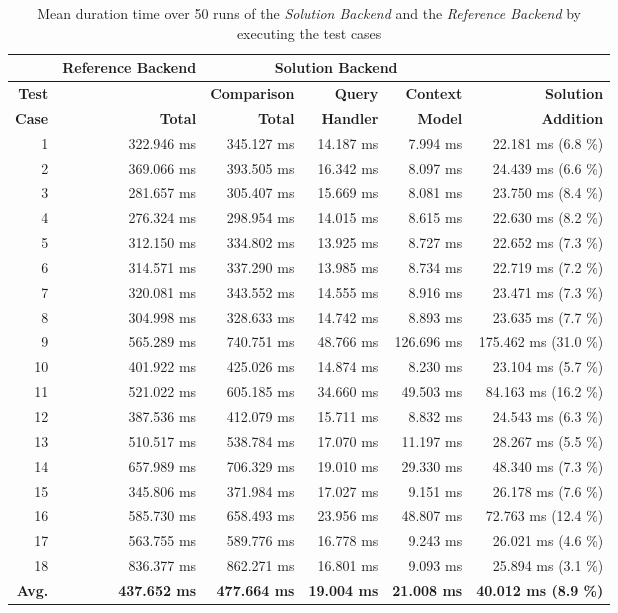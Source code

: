 \documentclass[draft,final]{vutinfth} %
\begin{document}
\begin{table}[]
	\caption{Mean duration time over 50 runs of the \textit{Solution Backend} and the \textit{Reference Backend} by executing the test cases}
	\begin{tabular}{r|r|r|r|r|r}
		
		\textbf{} & \textbf{Reference Backend} & \multicolumn{3}{c|}{\textbf{Solution Backend}} &  \\ \hline \textbf{Test} & \textbf{} & \textbf{Comparison} & \textbf{Query} & \textbf{Context} & \textbf{Solution} \\ 
		\textbf{Case} & \textbf{Total} & \textbf{Total} & \textbf{Handler} & \textbf{Model} & \textbf{Addition} \\ \hline
		1 & 322.946 ms & 345.127 ms & 14.187 ms & 7.994 ms & 22.181 ms (6.8 \%) \\ 
		2 & 369.066 ms & 393.505 ms & 16.342 ms & 8.097 ms & 24.439 ms (6.6 \%)\\ 
		3 & 281.657 ms & 305.407 ms & 15.669 ms & 8.081 ms & 23.750 ms (8.4 \%)\\ 
		4 & 276.324 ms & 298.954 ms & 14.015 ms & 8.615 ms & 22.630 ms (8.2 \%)\\ 
		5 & 312.150 ms & 334.802 ms & 13.925 ms & 8.727 ms & 22.652 ms (7.3 \%)\\ 
		6 & 314.571 ms & 337.290 ms & 13.985 ms & 8.734 ms & 22.719 ms (7.2 \%)\\ 
		7 & 320.081 ms & 343.552 ms & 14.555 ms & 8.916 ms & 23.471 ms (7.3 \%)\\ 
		8 & 304.998 ms & 328.633 ms & 14.742 ms & 8.893 ms & 23.635 ms (7.7 \%)\\ 
		9 & 565.289 ms & 740.751 ms & 48.766 ms & 126.696 ms & 175.462 ms (31.0 \%)\\ 
		10 & 401.922 ms & 425.026 ms & 14.874 ms & 8.230 ms & 23.104 ms (5.7 \%)\\ 
		11 & 521.022 ms & 605.185 ms & 34.660 ms & 49.503 ms & 84.163 ms (16.2 \%)\\ 
		12 & 387.536 ms & 412.079 ms & 15.711 ms & 8.832 ms & 24.543 ms (6.3 \%)\\ 
		13 & 510.517 ms & 538.784 ms & 17.070 ms & 11.197 ms & 28.267 ms (5.5 \%)\\ 
		14 & 657.989 ms & 706.329 ms & 19.010 ms & 29.330 ms & 48.340 ms (7.3 \%)\\ 
		15 & 345.806 ms & 371.984 ms & 17.027 ms & 9.151 ms & 26.178 ms (7.6 \%)\\ 
		16 & 585.730 ms & 658.493 ms & 23.956 ms & 48.807 ms & 72.763 ms (12.4 \%)\\ 
		17 & 563.755 ms & 589.776 ms & 16.778 ms & 9.243 ms & 26.021 ms (4.6 \%)\\ 
		18 & 836.377 ms & 862.271 ms & 16.801 ms & 9.093 ms & 25.894 ms (3.1 \%)\\ \hline
		\textbf{Avg.} & \textbf{437.652 ms} & \textbf{477.664 ms} & \textbf{19.004 ms} & \textbf{21.008 ms} & \textbf{40.012 ms (8.9 \%)} \\ 
	\end{tabular}
	\label{Tab:eva_performance}
\end{table}
\end{document}

